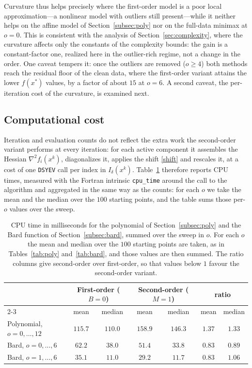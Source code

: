 \documentclass[11pt]{article}
\newcounter{alg}[section]
\begin{document}
Curvature thus helps precisely where the first-order model is a poor local
approximation---a nonlinear model with outliers still present---while it neither
helps on the affine model of Section~\ref{subsec:poly} nor on the full-data
minimax at $o = 0$. This is consistent with the analysis of
Section~\ref{sec:complexity}, where the curvature affects only the constants of the
complexity bounds: the gain is a constant-factor one, realized here in the
outlier-rich regime, not a change in the order. One caveat tempers it: once the
outliers are removed ($o \ge 4$) both
methods reach the residual floor of the clean data, where the first-order
variant attains the lower $f(x^*)$ values, by a factor of about $15$ at
$o = 6$. A second caveat, the per-iteration cost of the curvature, is examined
next.

\subsection{Computational cost} \label{subsec:time}

Iteration and evaluation counts do not reflect the extra work the second-order
variant performs at every iteration: for each active component it assembles the
Hessian $\nabla^2 f_i(x^k)$, diagonalizes it, applies the shift \eqref{shift}
and rescales it, at a cost of one \texttt{DSYEV} call per index in
$I_\delta(x^k)$. Table~\ref{tab:time} therefore reports CPU times, measured with
the Fortran intrinsic \texttt{cpu\_time} around the call to the algorithm and
aggregated in the same way as the counts: for each $o$ we take the mean and the
median over the $100$ starting points, and the table sums those per-$o$ values
over the sweep.

\begin{table}[ht!]
\centering
\begin{tabular}{l cc cc cc}
\hline
 & \multicolumn{2}{c}{First-order ($B=0$)}
 & \multicolumn{2}{c}{Second-order ($M=1$)}
 & \multicolumn{2}{c}{ratio} \\
\cline{2-3}\cline{4-5}\cline{6-7}
 & mean & median & mean & median & mean & median \\
\hline
Polynomial, $o=0,\dots,12$
  & $115.7$ & $110.0$ & $158.9$ & $146.3$ & $1.37$ & $1.33$ \\
Bard, $o=0,\dots,6$
  & $62.2$  & $38.0$  & $51.4$  & $33.8$  & $0.83$ & $0.89$ \\
Bard, $o=1,\dots,6$
  & $35.1$  & $11.0$  & $29.2$  & $11.7$  & $0.83$ & $1.06$ \\
\hline
\end{tabular}
\caption{CPU time in milliseconds for the polynomial of
Section~\ref{subsec:poly} and the Bard function of Section~\ref{subsec:bard},
summed over the sweep in $o$. For each $o$
the mean and median over the $100$ starting points are taken, as in
Tables~\ref{tab:poly} and~\ref{tab:bard}, and those values are then summed. The
ratio columns give second-order over first-order, so that values below $1$
favour the second-order variant.}
\label{tab:time}
\end{table}
\end{document}
